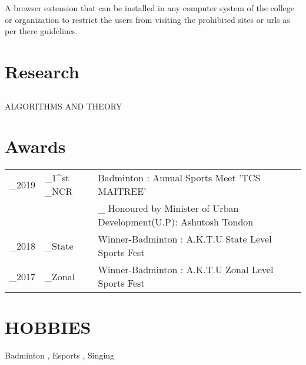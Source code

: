 \documentclass[]{deedy-resume-openfont}
\begin{document}
\begin{minipage}[t]{0.66\textwidth}
\begin{tightemize}
\end{tightemize}
\sectionsep

\vspace{\topsep} %
\begin{tightemize}
\item A browser extension that can be installed in any computer system of the college or organization to restrict the users from visiting the prohibited sites or urls as per there guidelines.

\end{tightemize}
\sectionsep



\section{Research}
\subsection {}
ALGORITHMS AND THEORY\\
\sectionsep

\section{Awards} 
\begin{tabular}{r l l}
_{2019} & _{1}^{st} _{NCR} & Badminton : Annual Sports Meet 'TCS MAITREE' \\
&  & _{\footnotesize{ Honoured by Minister of Urban Development(U.P): Ashutosh Tondon}}\\
_{2018} & _{State} & Winner-Badminton : A.K.T.U State Level Sports Fest \\

_{2017} & _{Zonal} & Winner-Badminton : A.K.T.U Zonal Level Sports Fest \\
\end{tabular}
\sectionsep



\section{HOBBIES}

Badminton , Esports , Singing
\sectionsep

\end{minipage} 
\end{document}
